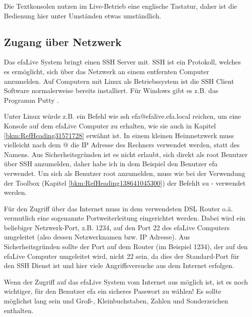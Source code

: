 \documentclass[a4paper,12pt,twoside]{article}
\begin{document}
\bigskip

Die Textkonsolen nutzen im Live-Betrieb eine englische Tastatur, daher
ist die Bedienung hier unter Umständen etwas umständlich.

\subsection{Zugang über Netzwerk }
Das efaLive System bringt einen SSH Server mit. SSH ist ein Protokoll,
welches es ermöglicht, sich über das Netzwerk an einem entfernten
Computer anzumelden. Auf Computern mit Linux als Betriebssystem ist die
SSH Client Software normalerweise bereits installiert. Für Windows gibt
es z.B. das Programm Putty \cite{PUT1}.

Unter Linux würde z.B. ein Befehl wie {\textquotedbl}ssh
efa@efalive.efa.local{\textquotedbl} reichen, um eine Konsole auf dem
efaLive Computer zu erhalten, wie sie auch in Kapitel
\ref{bkm:RefHeading31571728} erwähnt ist. In einem kleinen Heimnetzwerk
muss vielleicht nach dem {\textquotedbl}@{\textquotedbl} die IP Adresse
des Rechners verwendet werden, statt des Namens. Aus Sicherheitsgründen
ist es nicht erlaubt, sich direkt als
{\textquotedbl}root{\textquotedbl} Benutzer über SSH anzumelden, daher
habe ich in dem Beispiel den Benutzer {\textquotedbl}efa{\textquotedbl}
verwendet. Um sich als Benutzer {\textquotedbl}root{\textquotedbl}
anzumelden, muss wie bei der Verwendung der Toolbox (Kapitel
\ref{bkm:RefHeading138641045300}) der Befehlt {\textquotedbl}su
-{\textquotedbl} verwendet werden.


\bigskip

Für den Zugriff über das Internet muss in dem verwendeten DSL Router
o.ä. vermutlich eine sogenannte Portweiterleitung eingerichtet werden.
Dabei wird ein beliebiger Netzwerk-Port, z.B. 1234, auf den Port 22 des
efaLive Computers umgeleitet (also dessen Netzwerknamen bzw. IP
Adresse). Aus Sicherheitsgründen sollte der Port auf dem Router (im
Beispiel 1234), der auf den efaLive Computer umgeleitet wird, nicht 22
sein, da dies der Standard-Port für den SSH Dienst ist und hier viele
Angriffsversuche aus dem Internet erfolgen.

Wenn der Zugriff auf das efaLive System vom Internet aus möglich ist,
ist es noch wichtiger, für den Benutzer
{\textquotedbl}efa{\textquotedbl} ein sicheres Passwort zu wählen! Es
sollte möglichst lang sein und Groß-, Kleinbuchstaben, Zahlen und
Sonderzeichen enthalten.


\bigskip
\end{document}
